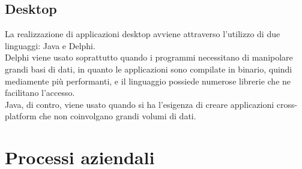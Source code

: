 \subsection{Desktop}
La realizzazione di applicazioni desktop avviene attraverso l'utilizzo di due linguaggi: Java e Delphi.\\
Delphi viene usato soprattutto quando i programmi necessitano di manipolare grandi basi di dati, in quanto le applicazioni sono compilate in binario, quindi mediamente più performanti, e il linguaggio possiede numerose librerie che ne facilitano l'accesso.\\
Java, di contro, viene usato quando si ha l'esigenza di creare applicazioni cross-platform che non coinvolgano grandi volumi di dati.

\section{Processi aziendali}
